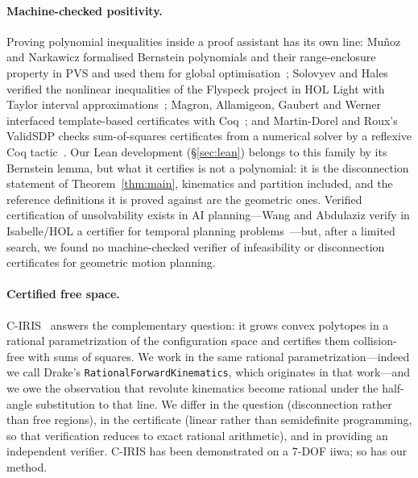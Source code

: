 \documentclass[10pt,twocolumn,letterpaper]{article}
\newif\ifhl \hlfalse  %
\newcommand{\new}[1]{\ifhl{\color{blue!65!black}#1}\else#1\fi}
\begin{document}
\paragraph{Machine-checked positivity.} \new{Proving polynomial inequalities inside a proof assistant has its own line: Mu\~noz and Narkawicz formalised Bernstein polynomials and their range-enclosure property in PVS and used them for global optimisation~\cite{munoz2013}; Solovyev and Hales verified the nonlinear inequalities of the Flyspeck project in HOL Light with Taylor interval approximations~\cite{solovyev2013}; Magron, Allamigeon, Gaubert and Werner interfaced template-based certificates with Coq~\cite{magron2015jfr}; and Martin-Dorel and Roux's ValidSDP checks sum-of-squares certificates from a numerical solver by a reflexive Coq tactic~\cite{martindorel2017}. Our Lean development (\S\ref{sec:lean}) belongs to this family by its Bernstein lemma, but what it certifies is not a polynomial: it is the disconnection statement of Theorem~\ref{thm:main}, kinematics and partition included, and the reference definitions it is proved against are the geometric ones. Verified certification of unsolvability exists in AI planning---Wang and Abdulaziz verify in Isabelle/HOL a certifier for temporal planning problems~\cite{wang2025}---but, after a limited search, we found no machine-checked verifier of infeasibility or disconnection certificates for geometric motion planning.}

\paragraph{Certified free space.} C-IRIS~\cite{amice2022wafr,dai2024ciris} answers the complementary question: it grows convex polytopes in a rational parametrization of the configuration space and certifies them collision-free with sums of squares. We work in the same rational parametrization---indeed we call Drake's \texttt{RationalForwardKinematics}, which originates in that work---and we owe the observation that revolute kinematics become rational under the half-angle substitution to that line. We differ in the question (disconnection rather than free regions), in the certificate (linear rather than semidefinite programming, so that verification reduces to exact rational arithmetic), and in providing an independent verifier. C-IRIS has been demonstrated on a 7-DOF iiwa; so has our method.
\end{document}

